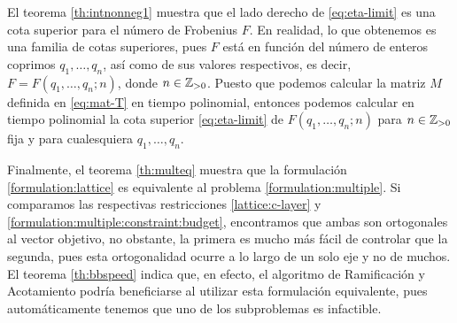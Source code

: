 El teorema \ref{th:intnonneg1} muestra que el lado derecho de \eqref{eq:eta-limit} es una cota
superior para el número de Frobenius $F$. En realidad, lo que obtenemos es una familia de cotas
superiores, pues $F$ está en función del número de enteros coprimos $q_1, \ldots, q_n$, así como de
sus valores respectivos, es decir, $F = F(q_1, \ldots, q_n; n)$, donde $n \in \mathbb{Z}_{> 0}$. Puesto que
podemos calcular la matriz $M$ definida en \eqref{eq:mat-T} en tiempo polinomial, entonces podemos
calcular en tiempo polinomial la cota superior \eqref{eq:eta-limit} de $F(q_1, \ldots, q_n; n)$ para
$n \in \mathbb{Z}_{> 0}$ fija y para cualesquiera $q_1, \ldots, q_n$.

Finalmente, el teorema \ref{th:multeq} muestra que la formulación \eqref{formulation:lattice} es
equivalente al problema \eqref{formulation:multiple}. Si comparamos las respectivas restricciones
\eqref{lattice:c-layer} y \eqref{formulation:multiple:constraint:budget}, encontramos que ambas son
ortogonales al vector objetivo, no obstante, la primera es mucho más fácil de controlar que la
segunda, pues esta ortogonalidad ocurre a lo largo de un solo eje y no de muchos. El teorema
\ref{th:bbspeed} indica que, en efecto, el algoritmo de Ramificación y Acotamiento podría
beneficiarse al utilizar esta formulación equivalente, pues automáticamente tenemos que uno de los
subproblemas es infactible.

